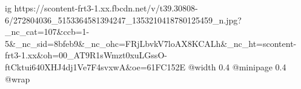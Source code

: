  
 
 
 
 

\ifcmt
  ig https://scontent-frt3-1.xx.fbcdn.net/v/t39.30808-6/272804036_5153364581394247_1353210418780125459_n.jpg?_nc_cat=107&ccb=1-5&_nc_sid=8bfeb9&_nc_ohc=FRjLbvkV7loAX8KCALh&_nc_ht=scontent-frt3-1.xx&oh=00_AT9R1sWmzt0xuLGssO-ftCktui640XHJ4dj1Ve7F4svxwA&oe=61FC152E
  @width 0.4
  @minipage 0.4
  @wrap \parpic[r]
\fi
